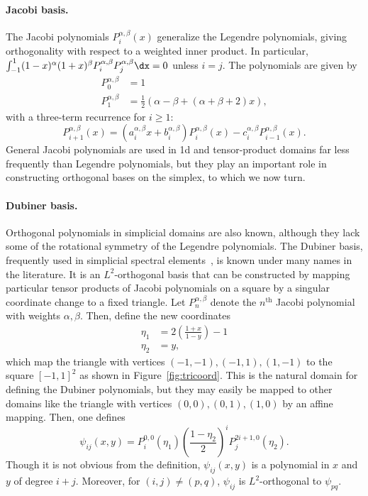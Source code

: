 \paragraph{Jacobi basis.}
The Jacobi polynomials $P^{\alpha,\beta}_i(x)$ generalize the Legendre
polynomials, giving orthogonality with respect to a weighted inner
product.  In particular, $\int_{-1}^1 (1-x)^\alpha (1+x)^\beta
P^{\alpha,\beta}_i P^{\alpha,\beta}_j \dx = 0$ unless $i=j$.
The polynomials are given by
\begin{equation}
\label{eq:firsttwojacobi}
\begin{split}
P_0^{\alpha,\beta} & = 1 \\
P_1^{\alpha,\beta} &
= \frac{1}{2}\left( \alpha - \beta + \left( \alpha + \beta + 2 \right)
x \right),
\end{split}
\end{equation}
with a three-term recurrence for $i\geqslant1$:
\begin{equation}
\label{eq:recur}
P_{i+1}^{\alpha,\beta}(x)
= (a^{\alpha,\beta}_i x + b^{\alpha,\beta}_i) P_i^{\alpha,\beta}(x) - c^{\alpha,\beta}_i P_{i-1}^{\alpha,\beta}(x).
\end{equation}
General Jacobi polynomials are used in 1d and tensor-product domains far
less frequently than Legendre polynomials, but they play an important role
in constructing orthogonal bases on the simplex, to which we now turn.


\paragraph{Dubiner basis.}
Orthogonal polynomials in simplicial domains are also known,
although they lack some of the rotational symmetry of the Legendre
polynomials.  The Dubiner basis, frequently used in simplicial spectral
elements~\citep{Dubiner1991}, is known under many names in the literature.
It is an $L^2$-orthogonal basis that can be constructed by mapping
particular tensor products of Jacobi polynomials on a square by a singular
coordinate change to a fixed triangle.  Let $P^{\alpha,\beta}_n$
denote the $n^\mathrm{th}$ Jacobi polynomial with weights $\alpha,
\beta$.  Then, define the new coordinates
\begin{equation}
\label{eq:dubcoord}
\begin{split}
\eta_1 & = 2\left(\frac{1+x}{1-y}\right)-1 \\
\eta_2 & = y,
\end{split}
\end{equation}
which map
the triangle with vertices $(-1,-1),(-1,1),(1,-1)$
to the square $[-1,1]^2$
as shown in Figure~\ref{fig:tricoord}.  This is
the natural domain for defining the Dubiner polynomials, but they may
easily be mapped to other domains like the triangle with vertices
$(0,0) , (0,1) , (1,0)$ by an affine mapping.
Then, one defines
\begin{equation}
\psi_{ij}(x,y) = P_i^{0,0}(\eta_1) \left( \frac{1-\eta_2}{2}
\right)^i P_j^{2i+1,0}(\eta_2).
\end{equation}
Though it is not obvious from the definition, $\psi_{ij}(x,y)$ is
a polynomial in $x$ and $y$ of degree $i + j$.  Moreover,
for $(i,j) \neq (p,q)$, $\psi_{ij}$ is $L^2$-orthogonal to
$\psi_{pq}$.

